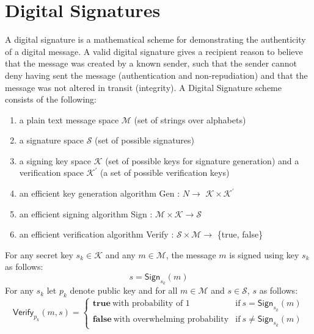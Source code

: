 \section{Digital Signatures}
	\label{sec:digital-signature}
	A digital signature is a mathematical scheme for demonstrating the authenticity of a digital message. 
	A valid digital signature gives a recipient reason to believe that the message was created by a known sender, such that the sender cannot deny having sent the message (authentication and non-repudiation) and that the message was not altered in transit (integrity).
	A Digital Signature scheme consists of the following:
	\begin{enumerate}
		\item a plain text message space $\mathcal{M}$ (set of strings over alphabets)
		\item a signature space $\mathcal{S}$ (set of possible signatures)
		\item a signing key space $\mathcal{K}$ (set of possible keys for signature generation) and a verification space $\mathcal{K^{'}}$ (a set of possible verification keys)
		\item an efficient key generation algorithm \textsf{Gen} : $N \rightarrow$ $\mathcal{K} \times \mathcal{K^{'}} $ 
		\item an efficient signing algorithm \textsf{Sign} : $ \mathcal{M} \times \mathcal{K} \rightarrow \mathcal{S}$
		\item an efficient verification algorithm \textsf{Verify} : $\mathcal{S} \times \mathcal{M} \rightarrow$ \{true, false\} 
	\end{enumerate}
	For any secret key $s_{k} \in \mathcal{K}$ and any $m \in \mathcal{M}$,	the message $m$ is signed using key $s_{k}$ as follows:
		\begin{equation}
			s = \textsf{Sign}_{s_{k}}(m)
			\label{eq:signature}
		\end{equation}
	For any $s_{k}$ let $p_{k}$ denote public key and for all $m \in \mathcal{M}$ and $s \in \mathcal{S}$, $s$ as follows:
	\begin{equation}
		\textsf{Verify}_{p_{k}}(m,s) = 
		\begin{cases}
		 \textbf{true}\ \mbox{with probability of 1} & \mbox{if}\ s = \textsf{Sign}_{s_{k}}(m)\\
		 \textbf{false}\ \mbox{with overwhelming probability} & \mbox{if}\ s \neq \textsf{Sign}_{s_{k}}(m)
		\end{cases}
		\label{eq:verification}
	\end{equation}
